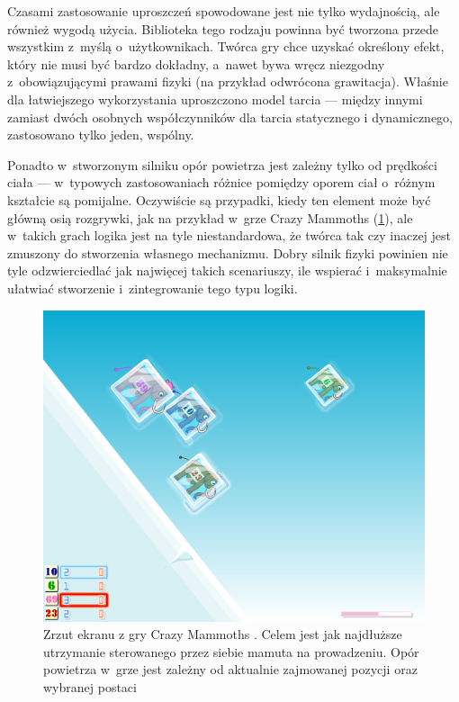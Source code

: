Czasami zastosowanie uproszczeń spowodowane jest nie tylko wydajnością, ale również wygodą użycia. Biblioteka tego rodzaju powinna być tworzona przede wszystkim z~myślą o~użytkownikach. Twórca gry chce uzyskać określony efekt, który nie musi być bardzo dokładny, a~nawet bywa wręcz niezgodny z~obowiązującymi prawami fizyki (na przykład odwrócona grawitacja). Właśnie dla łatwiejszego wykorzystania uproszczono model tarcia --- między innymi zamiast dwóch osobnych współczynników dla tarcia statycznego i dynamicznego, zastosowano tylko jeden, wspólny. 

Ponadto w~stworzonym silniku opór powietrza jest zależny tylko od prędkości ciała --- w~typowych zastosowaniach różnice pomiędzy oporem ciał o~różnym kształcie są pomijalne. Oczywiście są przypadki, kiedy ten element może być główną osią rozgrywki, jak na przykład w~grze Crazy Mammoths (\ref{fig:crazy-mammoths}), ale w~takich grach logika jest na tyle niestandardowa, że twórca tak czy inaczej jest zmuszony do stworzenia własnego mechanizmu. Dobry silnik fizyki powinien nie tyle odzwierciedlać jak najwięcej takich scenariuszy, ile wspierać i~maksymalnie ułatwiać stworzenie i~zintegrowanie tego typu logiki.

\begin{figure}[ht]
	\centering
	\includegraphics[width=0.7\linewidth]{images/crazy-mammoths}
	\caption[Zrzut ekranu z gry Crazy Mammoths]{Zrzut ekranu z gry Crazy Mammoths \cite{bib:crazy-mammoths}. Celem jest jak najdłuższe utrzymanie sterowanego przez siebie mamuta na prowadzeniu. Opór powietrza w~grze jest zależny od aktualnie zajmowanej pozycji oraz wybranej postaci}
	\label{fig:crazy-mammoths}
\end{figure}



